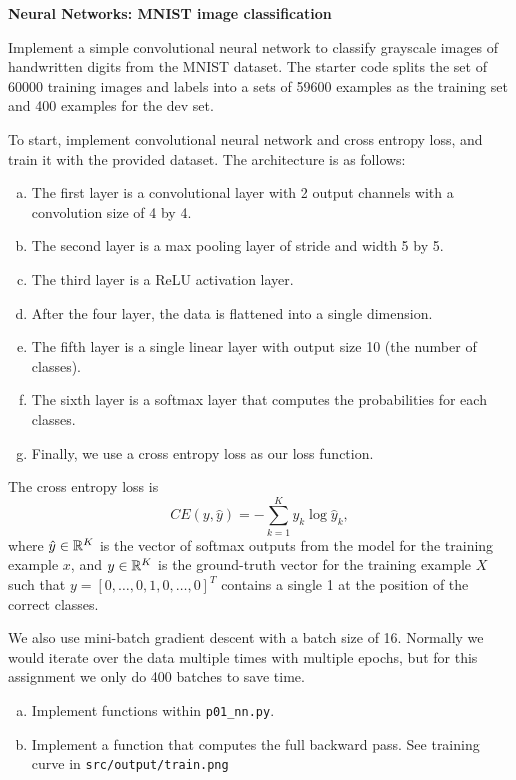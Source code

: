 \documentclass[12pt,letterpaper,boxed]{hmcpset}
\begin{document}

\begin{problem}[Problem 1]
\textbf{Neural Networks: MNIST image classification}

Implement a simple convolutional neural network to classify grayscale images of handwritten digits from the MNIST dataset. The starter code splits the set of 60000 training images and labels into a sets of 59600 examples as the training set and 400 examples for the dev set.

To start, implement convolutional neural network and cross entropy loss, and train it with the provided dataset. The architecture is as follows:
\begin{enumerate}[(a)]
  \item The first layer is a convolutional layer with 2 output channels with a convolution size of 4 by 4.
  \item The second layer is a max pooling layer of stride and width 5 by 5.
  \item The third layer is a ReLU activation layer.
  \item After the four layer, the data is flattened into a single dimension.
  \item The fifth layer is a single linear layer with output size 10 (the number of classes).
  \item The sixth layer is a softmax layer that computes the probabilities for each classes.
  \item Finally, we use a cross entropy loss as our loss function.
\end{enumerate}

The cross entropy loss is
\[
CE(y, \hat y) = - \sum_{k=1}^K y_k \log \hat{y}_k,
\]
where $\hat y \in \mathbb{R}^K$ is the vector of softmax outputs from the model for the training example $x$, and $y \in \mathbb{R}^K$ is the ground-truth vector for the training example $X$ such that $y = [0, \dots, 0, 1, 0, \dots, 0]^T$ contains a single 1 at the position of the correct classes.

We also use mini-batch gradient descent with a batch size of 16. Normally we would iterate over the data multiple times with multiple epochs, but for this assignment we only do 400 batches to save time.
\end{problem}

\begin{solution}
\begin{enumerate}[(a)]
  \item Implement functions within \verb|p01_nn.py|.
  \item Implement a function that computes the full backward pass. See training curve in \verb|src/output/train.png|
\end{enumerate}
\end{solution}
\end{document}
